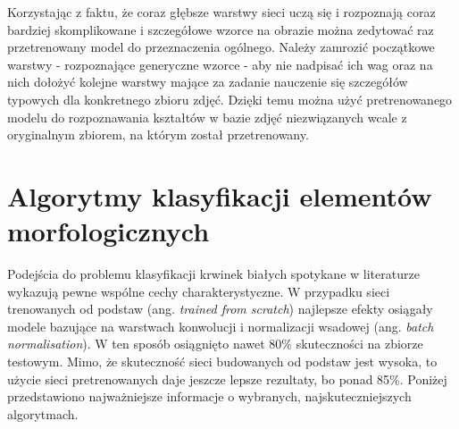 Korzystając z faktu, że coraz głębsze warstwy sieci uczą się i rozpoznają coraz bardziej skomplikowane i szczegółowe wzorce na obrazie można zedytować raz przetrenowany model do przeznaczenia ogólnego. Należy zamrozić początkowe warstwy - rozpoznające generyczne wzorce - aby nie nadpisać ich wag oraz na nich dołożyć kolejne warstwy mające za zadanie nauczenie się szczegółów typowych dla konkretnego zbioru zdjęć. Dzięki temu można użyć pretrenowanego modelu do rozpoznawania kształtów w bazie zdjęć niezwiązanych wcale z oryginalnym zbiorem, na którym został przetrenowany. 


\section{Algorytmy klasyfikacji elementów morfologicznych}

Podejścia do problemu klasyfikacji krwinek białych spotykane w literaturze wykazują pewne wspólne cechy charakterystyczne. W przypadku sieci trenowanych od podstaw (ang. \textit{trained from scratch}) najlepsze efekty osiągały modele bazujące na warstwach konwolucji i normalizacji wsadowej (ang. \textit{batch normalisation}). W ten sposób osiągnięto nawet 80\% skuteczności na zbiorze testowym. Mimo, że skuteczność sieci budowanych od podstaw jest wysoka, to użycie sieci pretrenowanych daje jeszcze lepsze rezultaty, bo ponad 85\%. Poniżej przedstawiono najważniejsze informacje o wybranych, najskuteczniejszych algorytmach.


